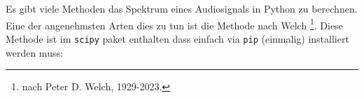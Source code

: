 



Es gibt viele Methoden das Spektrum eines Audiosignals in Python zu berechnen. Eine der angenehmsten Arten dies zu tun ist die Methode nach Welch \footnote{nach Peter D. Welch, 1929-2023.}. Diese Methode ist im \texttt{scipy} paket enthalten dass einfach via \texttt{pip} (einmalig) installiert werden muss:

